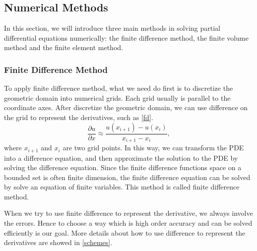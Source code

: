 \documentclass[english, nochinese]{pkupaper}
\begin{document}
\subsection{Numerical Methods}
\par In this section, we will introduce three main methods in solving partial differential equations numerically: the finite difference method, the finite volume method and the finite element method.

\subsubsection{Finite Difference Method}
\par To apply finite difference method, what we need do first is to discretize the geometric domain into numerical grids. Each grid usually is parallel to the coordinate axes. After discretize the geometric domain, we can use difference on the grid to represent the derivatives, such as \eqref{fd}.
\begin{equation}\label{fd}
	\frac{\partial u}{\partial x}\approx\frac{u(x_{i+1}) - u(x_i)}{x_{i+1} - x_i},
\end{equation}
where $x_{i+1}$ and $x_i$ are two grid points. In this way, we can transform the PDE into a difference equation, and then approximate the solution to the PDE by solving the difference equation. Since the finite difference functions space on a bounded set is often finite dimension, the finite difference equation can be solved by solve an equation of finite variables. This method is called finite difference method.
\par When we try to use finite difference to represent the derivative, we always involve the errors. Hence to choose a way which is high order accuracy and can be solved efficiently is our goal. More details about how to use difference to represent the derivatives are showed in \ref{schemes}.
\end{document}
